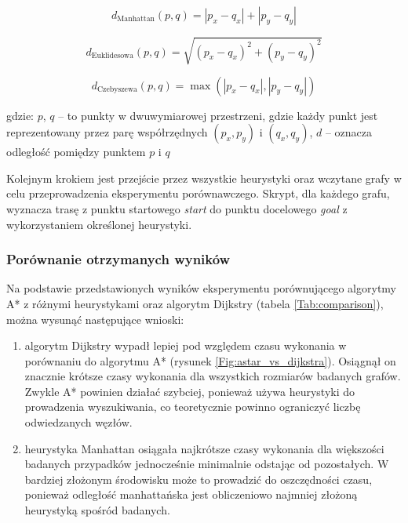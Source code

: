 \documentclass[12pt,twoside]{article}
\begin{document}
\begin{equation}
d_{\text{Manhattan}}(p, q) = |p_x - q_x| + |p_y - q_y|
\label{Eq:manhattan}
\end{equation}

\begin{equation}
d_{\text{Euklidesowa}}(p, q) = \sqrt{(p_x - q_x)^2 + (p_y - q_y)^2}
\label{Eq:euclidean}
\end{equation}

\begin{equation}
d_{\text{Czebyszewa}}(p, q) = \max(|p_x - q_x|, |p_y - q_y|)
\label{Eq:czebyszewa}
\end{equation}

gdzie: $p$, $q$ -- to punkty w dwuwymiarowej przestrzeni, gdzie każdy punkt jest reprezentowany przez parę współrzędnych $(p_x, p_y)$ i $(q_x, q_y)$, $d$ -- oznacza odległość pomiędzy punktem $p$ i $q$ \\

\newpage

Kolejnym krokiem jest przejście przez wszystkie heurystyki oraz wczytane grafy w celu przeprowadzenia eksperymentu porównawczego. Skrypt, dla każdego grafu, wyznacza trasę z punktu startowego \textit{start} do punktu docelowego \textit{goal} z wykorzystaniem określonej heurystyki.

\subsubsection{Porównanie otrzymanych wyników}

Na podstawie przedstawionych wyników eksperymentu porównującego algorytmy A* z różnymi heurystykami oraz algorytm Dijkstry (tabela \ref{Tab:comparison}), można wysunąć następujące wnioski:

\begin{enumerate}[label=\alph*), leftmargin=1.25cm]
	\item algorytm Dijkstry wypadł lepiej pod względem czasu wykonania w porównaniu do algorytmu A* (rysunek \ref{Fig:astar_vs_dijkstra}). Osiągnął on znacznie krótsze czasy wykonania dla wszystkich rozmiarów badanych grafów. Zwykle A* powinien działać szybciej, ponieważ używa heurystyki do prowadzenia wyszukiwania, co teoretycznie powinno ograniczyć liczbę odwiedzanych węzłów.
	\item heurystyka Manhattan osiągała najkrótsze czasy wykonania dla większości badanych przypadków jednocześnie minimalnie odstając od pozostałych. W bardziej złożonym środowisku może to prowadzić do oszczędności czasu, ponieważ odległość manhattańska jest obliczeniowo najmniej złożoną heurystyką spośród badanych.
\end{enumerate}
\end{document}

